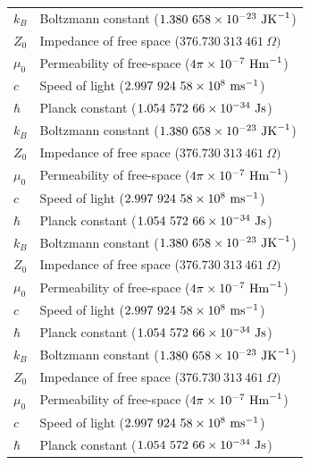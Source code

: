 \begin{longtable}{l p{}}
    $k_B$   & Boltzmann constant  ($1.380\ 658\times 10^{-23}\ \mbox{JK}^{-1} $) \\
    $Z_0$   & Impedance of free space  ($376.730\ 313\ 461\ \Omega) $    \\
    $\mu_0$ & Permeability of free-space ($4\pi\times 10^{-7}\ \mbox{Hm}^{-1}$)  \\
    $c$     & Speed of light ($2.997\ 924\ 58 \times 10^{8}\ \mbox{ms}^{-1}$)    \\
    $\hbar$ & Planck constant ($1.054\ 572\ 66\times 10^{-34}\ \mbox{Js}$)       \\
    $k_B$   & Boltzmann constant  ($1.380\ 658\times 10^{-23}\ \mbox{JK}^{-1} $) \\
    $Z_0$   & Impedance of free space  ($376.730\ 313\ 461\ \Omega) $    \\
    $\mu_0$ & Permeability of free-space ($4\pi\times 10^{-7}\ \mbox{Hm}^{-1}$)  \\
    $c$     & Speed of light ($2.997\ 924\ 58 \times 10^{8}\ \mbox{ms}^{-1}$)    \\
    $\hbar$ & Planck constant ($1.054\ 572\ 66\times 10^{-34}\ \mbox{Js}$)       \\
    $k_B$   & Boltzmann constant  ($1.380\ 658\times 10^{-23}\ \mbox{JK}^{-1} $) \\
    $Z_0$   & Impedance of free space  ($376.730\ 313\ 461\ \Omega) $    \\
    $\mu_0$ & Permeability of free-space ($4\pi\times 10^{-7}\ \mbox{Hm}^{-1}$)  \\
    $c$     & Speed of light ($2.997\ 924\ 58 \times 10^{8}\ \mbox{ms}^{-1}$)    \\
    $\hbar$ & Planck constant ($1.054\ 572\ 66\times 10^{-34}\ \mbox{Js}$)       \\
    $k_B$   & Boltzmann constant  ($1.380\ 658\times 10^{-23}\ \mbox{JK}^{-1} $) \\
    $Z_0$   & Impedance of free space  ($376.730\ 313\ 461\ \Omega) $    \\
    $\mu_0$ & Permeability of free-space ($4\pi\times 10^{-7}\ \mbox{Hm}^{-1}$)  \\
    $c$     & Speed of light ($2.997\ 924\ 58 \times 10^{8}\ \mbox{ms}^{-1}$)    \\
    $\hbar$ & Planck constant ($1.054\ 572\ 66\times 10^{-34}\ \mbox{Js}$)
\end{longtable}
